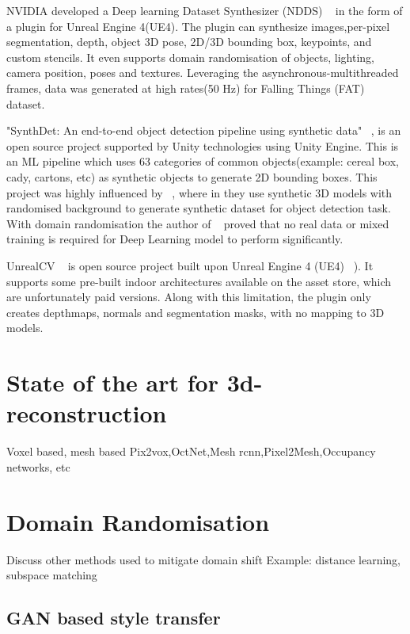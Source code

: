 NVIDIA developed a Deep learning Dataset Synthesizer (NDDS) ~\cite{to2018ndds} in the form of a plugin for Unreal Engine 4(UE4).
The plugin can synthesize images,per-pixel segmentation, depth, object 3D pose, 2D/3D bounding box, keypoints, and custom stencils.
It even supports domain randomisation of objects, lighting, camera position, poses and textures.
Leveraging the asynchronous-multithreaded frames, data was generated at high rates(50 Hz) for Falling Things (FAT) ~\cite{tremblay2018falling} dataset.

"SynthDet: An end-to-end object detection pipeline using synthetic data" ~\cite{synthdet2020}, is an open source project supported by Unity technologies using Unity Engine.
This is an ML pipeline which uses 63 categories of common objects(example: cereal box, cady, cartons, etc) as synthetic objects to generate 2D bounding boxes.
This project was highly influenced by ~\cite{hinterstoisser2019annotation}, where in they use synthetic 3D models with randomised background to generate synthetic dataset for object detection task.
With domain randomisation the author of ~\cite{hinterstoisser2019annotation} proved that no real data or mixed training is required for Deep Learning model to perform significantly.

UnrealCV ~\cite{qiu2017unrealcv} is open source project built upon Unreal Engine 4 (UE4) ~\cite{unrealengine}).
It supports some pre-built indoor architectures available on the asset store, which are unfortunately paid versions.
Along with this limitation, the plugin only creates depthmaps, normals and segmentation masks, with no mapping to 3D models.


\section{State of the art for 3d-reconstruction}\label{ss:state_of_the_art}
Voxel based, mesh based
Pix2vox,OctNet,Mesh rcnn,Pixel2Mesh,Occupancy networks, etc

\section{Domain Randomisation}\label{s:domain randomisation}
Discuss other methods used to mitigate domain shift
Example: distance learning, subspace matching

\subsection{GAN based style transfer}\label{s:gan_based_styletransfer}


